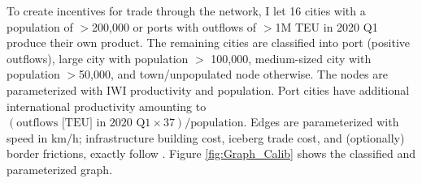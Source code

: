 \documentclass[a4paper]{article}
\begin{document}
To create incentives for trade through the network, I let 16 cities with a population of $>$200,000 or ports with outflows of $>$1M TEU in 2020 Q1 produce their own product. The remaining cities are classified into port (positive outflows), large city with population $>$ 100,000, medium-sized city with population $>$50,000, and town/unpopulated node otherwise. The nodes are parameterized with IWI productivity and population. Port cities have additional international productivity amounting to $(\text{outflows [TEU] in 2020 Q1}\times 37)/\text{population}$. Edges are parameterized with speed in km/h; infrastructure building cost, iceberg trade cost, and (optionally) border frictions, exactly follow \citet{krantz2024optimal}. Figure \ref{fig:Graph_Calib} shows the classified and parameterized graph. %
\end{document}
